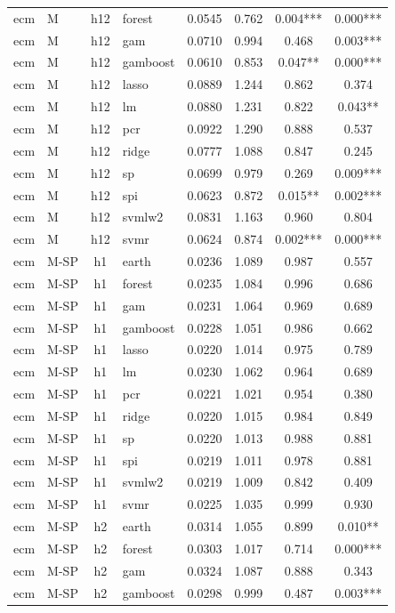 \begin{ThreePartTable}
\begin{longtable}[t]{llclcccc}
ecm & M & h12 & forest & 0.0545 & 0.762 & 0.004*** & 0.000***\\
ecm & M & h12 & gam & 0.0710 & 0.994 & 0.468 & 0.003***\\
ecm & M & h12 & gamboost & 0.0610 & 0.853 & 0.047** & 0.000***\\
ecm & M & h12 & lasso & 0.0889 & 1.244 & 0.862 & 0.374\\
ecm & M & h12 & lm & 0.0880 & 1.231 & 0.822 & 0.043**\\
ecm & M & h12 & pcr & 0.0922 & 1.290 & 0.888 & 0.537\\
ecm & M & h12 & ridge & 0.0777 & 1.088 & 0.847 & 0.245\\
ecm & M & h12 & sp & 0.0699 & 0.979 & 0.269 & 0.009***\\
ecm & M & h12 & spi & 0.0623 & 0.872 & 0.015** & 0.002***\\
ecm & M & h12 & svmlw2 & 0.0831 & 1.163 & 0.960 & 0.804\\
ecm & M & h12 & svmr & 0.0624 & 0.874 & 0.002*** & 0.000***\\
\addlinespace
ecm & M-SP & h1 & earth & 0.0236 & 1.089 & 0.987 & 0.557\\
ecm & M-SP & h1 & forest & 0.0235 & 1.084 & 0.996 & 0.686\\
ecm & M-SP & h1 & gam & 0.0231 & 1.064 & 0.969 & 0.689\\
ecm & M-SP & h1 & gamboost & 0.0228 & 1.051 & 0.986 & 0.662\\
ecm & M-SP & h1 & lasso & 0.0220 & 1.014 & 0.975 & 0.789\\
ecm & M-SP & h1 & lm & 0.0230 & 1.062 & 0.964 & 0.689\\
ecm & M-SP & h1 & pcr & 0.0221 & 1.021 & 0.954 & 0.380\\
ecm & M-SP & h1 & ridge & 0.0220 & 1.015 & 0.984 & 0.849\\
ecm & M-SP & h1 & sp & 0.0220 & 1.013 & 0.988 & 0.881\\
ecm & M-SP & h1 & spi & 0.0219 & 1.011 & 0.978 & 0.881\\
ecm & M-SP & h1 & svmlw2 & 0.0219 & 1.009 & 0.842 & 0.409\\
ecm & M-SP & h1 & svmr & 0.0225 & 1.035 & 0.999 & 0.930\\
\addlinespace
ecm & M-SP & h2 & earth & 0.0314 & 1.055 & 0.899 & 0.010**\\
ecm & M-SP & h2 & forest & 0.0303 & 1.017 & 0.714 & 0.000***\\
ecm & M-SP & h2 & gam & 0.0324 & 1.087 & 0.888 & 0.343\\
ecm & M-SP & h2 & gamboost & 0.0298 & 0.999 & 0.487 & 0.003***\\

\end{longtable}
\end{ThreePartTable}
